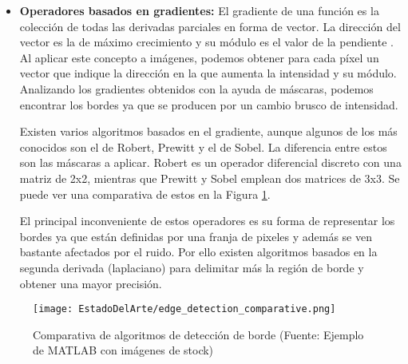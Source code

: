 \begin{itemize}
\item \textbf{Operadores basados en gradientes:} El gradiente de una función es la colección de todas las derivadas parciales en forma de vector. La dirección del vector es la de máximo crecimiento y su módulo es el valor de la pendiente \cite{khan}. Al aplicar este concepto a imágenes, podemos obtener para cada píxel un vector que indique la dirección en la que aumenta la intensidad y su módulo. Analizando los gradientes obtenidos con la ayuda de máscaras, podemos encontrar los bordes ya que se producen por un cambio brusco de intensidad.

Existen varios algoritmos basados en el gradiente, aunque algunos de los más conocidos son el de Robert, Prewitt y el de Sobel. La diferencia entre estos son las máscaras a aplicar. Robert es un operador diferencial discreto con una matriz de 2x2, mientras que Prewitt y Sobel emplean dos matrices de 3x3. Se puede ver una comparativa de estos en la Figura \ref{fig:EDGE}.

El principal inconveniente de estos operadores es su forma de representar los bordes ya que están definidas por una franja de pixeles y además se ven bastante afectados por el ruido. Por ello existen algoritmos basados en la segunda derivada (laplaciano) para delimitar más la región de borde y obtener una mayor precisión.
\end{itemize}

\begin{figure}[ht]
	\centering
	\texttt{[image: EstadoDelArte/edge\_detection\_comparative.png]}
	\caption[Comparativa de algoritmos de detección de borde]{Comparativa de algoritmos de detección de borde (Fuente: Ejemplo 		de MATLAB con imágenes de stock)}
	\label{fig:EDGE}
	\vspace{-5pt}
\end{figure}

